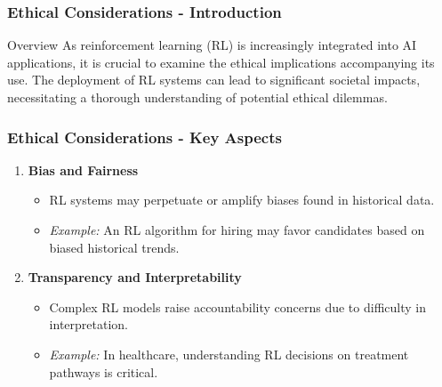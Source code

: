 \documentclass{beamer}
\begin{document}
\begin{frame}[fragile]
    \frametitle{Ethical Considerations - Introduction}
    \begin{block}{Overview}
        As reinforcement learning (RL) is increasingly integrated into AI applications, it is crucial to examine the ethical implications accompanying its use. 
        The deployment of RL systems can lead to significant societal impacts, necessitating a thorough understanding of potential ethical dilemmas.
    \end{block}
\end{frame}

\begin{frame}[fragile]
    \frametitle{Ethical Considerations - Key Aspects}
    \begin{enumerate}
        \item \textbf{Bias and Fairness}
            \begin{itemize}
                \item RL systems may perpetuate or amplify biases found in historical data.
                \item \textit{Example:} An RL algorithm for hiring may favor candidates based on biased historical trends.
            \end{itemize}
        \item \textbf{Transparency and Interpretability}
            \begin{itemize}
                \item Complex RL models raise accountability concerns due to difficulty in interpretation.
                \item \textit{Example:} In healthcare, understanding RL decisions on treatment pathways is critical.
            \end{itemize}
    \end{enumerate}
\end{frame}
\end{document}
